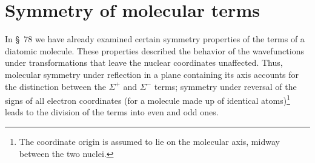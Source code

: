 \section{Symmetry of molecular terms}

In \S~78 we have already examined certain symmetry properties of the terms of a diatomic molecule. These properties described the behavior of the wavefunctions under transformations that leave the nuclear coordinates unaffected. Thus, molecular symmetry under reflection in a plane containing its axis accounts for the distinction between the $\Sigma^+$ and $\Sigma^-$ terms; symmetry under reversal of the signs of all electron coordinates (for a molecule made up of identical atoms)\footnote{The coordinate origin is assumed to lie on the molecular axis, midway between the two nuclei.} leads to the division of the terms into even and odd ones.
